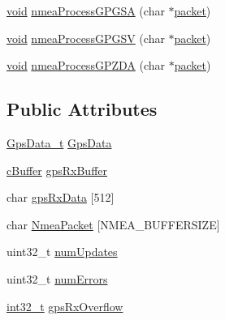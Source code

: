 \begin{DoxyCompactItemize}
\item 
\hyperlink{group___u_a_v_objects_plugin_ga444cf2ff3f0ecbe028adce838d373f5c}{void} \hyperlink{group___g_p_s_gadget_plugin_gad10ce6b495849dd4cf6e019d650a87f7}{nmea\-Process\-G\-P\-G\-S\-A} (char $\ast$\hyperlink{group___antenna_track_gadget_plugin_gaa52c8cc41458c01d411d550d1e3f3d96}{packet})
\item 
\hyperlink{group___u_a_v_objects_plugin_ga444cf2ff3f0ecbe028adce838d373f5c}{void} \hyperlink{group___g_p_s_gadget_plugin_ga35b60b2a2f0643fd5202557a5aaace81}{nmea\-Process\-G\-P\-G\-S\-V} (char $\ast$\hyperlink{group___antenna_track_gadget_plugin_gaa52c8cc41458c01d411d550d1e3f3d96}{packet})
\item 
\hyperlink{group___u_a_v_objects_plugin_ga444cf2ff3f0ecbe028adce838d373f5c}{void} \hyperlink{group___g_p_s_gadget_plugin_ga01e0952dc227b7f7d3cef2d36f684544}{nmea\-Process\-G\-P\-Z\-D\-A} (char $\ast$\hyperlink{group___antenna_track_gadget_plugin_gaa52c8cc41458c01d411d550d1e3f3d96}{packet})
\end{DoxyCompactItemize}
\subsection*{Public Attributes}
\begin{DoxyCompactItemize}
\item 
\hyperlink{group___g_p_s_gadget_plugin_ga4f1b5520a42a0033fb4d09fc7cbc2197}{Gps\-Data\-\_\-t} \hyperlink{group___g_p_s_gadget_plugin_ga5ed5a691ba188edd73dbfa5e6a72ee31}{Gps\-Data}
\item 
\hyperlink{group__buffer_ga63b2a19263ed371e329776b34f3164eb}{c\-Buffer} \hyperlink{group___g_p_s_gadget_plugin_gae55785b07246236cfe8d6c3139becff1}{gps\-Rx\-Buffer}
\item 
char \hyperlink{group___g_p_s_gadget_plugin_gaef781170a93672b3bbc887fcabdcb369}{gps\-Rx\-Data} \mbox{[}512\mbox{]}
\item 
char \hyperlink{group___g_p_s_gadget_plugin_ga3d1bdb9e4264f153e4537750bb8d7fd9}{Nmea\-Packet} \mbox{[}N\-M\-E\-A\-\_\-\-B\-U\-F\-F\-E\-R\-S\-I\-Z\-E\mbox{]}
\item 
uint32\-\_\-t \hyperlink{group___g_p_s_gadget_plugin_ga08ee9a94774bf6691a26d600e1ea51a9}{num\-Updates}
\item 
uint32\-\_\-t \hyperlink{group___g_p_s_gadget_plugin_gaef5bd2863b92f02db2ad4ef9e66e9437}{num\-Errors}
\item 
\hyperlink{glext_8h_a37994e3b11c72957c6f454c6ec96d43d}{int32\-\_\-t} \hyperlink{group___g_p_s_gadget_plugin_gaf0b70b48a4a5943f40dc14c11b8e0712}{gps\-Rx\-Overflow}
\end{DoxyCompactItemize}
